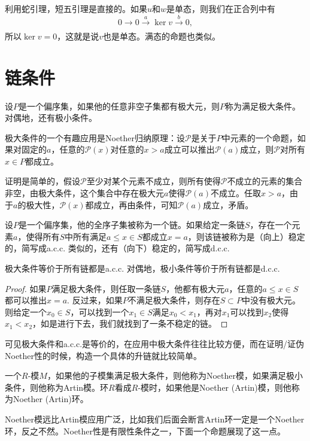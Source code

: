 利用蛇引理，短五引理是直接的。如果$u$和$w$是单态，则我们在正合列中有
\[
	0\to 0 \xrightarrow[~~~]{a}\ker v \xrightarrow[~~~]{b}0,
\]
所以$\ker v=0$，这就是说$v$也是单态。满态的命题也类似。

\section{链条件}

\para 设$P$是一个偏序集，如果他的任意非空子集都有极大元，则$P$称为满足极大条件。对偶地，还有极小条件。

极大条件的一个有趣应用是Noether归纳原理：设$\mathcal{P}$是关于$P$中元素的一个命题，如果对固定的$a$，任意的$\mathcal{P}(x)$对任意的$x>a$成立可以推出$\mathcal{P}(a)$成立，则$\mathcal{P}$对所有$x\in P$都成立。

证明是简单的，假设$\mathcal{P}$至少对某个元素不成立，则所有使得$\mathcal{P}$不成立的元素的集合非空，由极大条件，这个集合中存在极大元$a$使得$\mathcal{P}(a)$不成立。任取$x>a$，由于$a$的极大性，$\mathcal{P}(x)$都成立，再由条件，可知$\mathcal{P}(a)$成立，矛盾。

\para 设$P$是一个偏序集，他的全序子集被称为一个链。如果给定一条链$S$，存在一个元素$a$，使得所有$S$中所有满足$a\leq x\in S$都成立$x=a$，则该链被称为是（向上）稳定的，简写成a.c.c. 类似的，还有（向下）稳定的，简写成d.c.c.

\begin{pro}
极大条件等价于所有链都是a.c.c. 对偶地，极小条件等价于所有链都是d.c.c.
\end{pro}

\begin{proof}
	如果$P$满足极大条件，则任取一条链$S$，他都有极大元$a$，任意的$a\leq x\in S$都可以推出$x=a$. 反过来，如果$P$不满足极大条件，则存在$S\subset P$中没有极大元。则给定一个$x_0\in S$，可以找到一个$x_1\in S$满足$x_0<x_1$，再对$x_1$可以找到$x_2$使得$x_1<x_2$，如是进行下去，我们就找到了一条不稳定的链。
\end{proof}

可见极大条件和a.c.c.是等价的，在应用中极大条件往往比较方便，而在证明/证伪Noether性的时候，构造一个具体的升链就比较简单。

\para 一个$R$-模$M$，如果他的子模集满足极大条件，则他称为Noether模，如果满足极小条件，则他称为Artin模。环$R$看成$R$-模时，如果他是Noether (Artin)模，则他称为Noether (Artin)环。

Noether模远比Artin模应用广泛，比如我们后面会断言Artin环一定是一个Noether环，反之不然。Noether性是有限性条件之一，下面一个命题展现了这一点。


